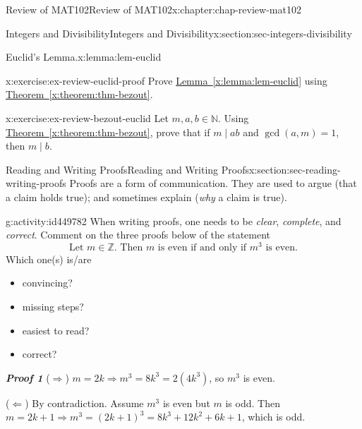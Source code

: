 \documentclass[oneside,10pt,]{book}
\newcommand{\xreffont}{\relax}
\newcommand{\alert}[1]{\textbf{\textit{#1}}}
\numberwithin{equation}{section}
\begin{document}
\begin{chapterptx}{Review of MAT102}{}{Review of MAT102}{}{}{x:chapter:chap-review-mat102}
\begin{sectionptx}{Integers and Divisibility}{}{Integers and Divisibility}{}{}{x:section:sec-integers-divisibility}
\begin{lemma}{Euclid's Lemma.}{}{x:lemma:lem-euclid}
\end{lemma}
\begin{inlineexercise}{}{x:exercise:ex-review-euclid-proof}%
Prove \hyperref[x:lemma:lem-euclid]{Lemma~{\xreffont\ref{x:lemma:lem-euclid}}} using \hyperref[x:theorem:thm-bezout]{Theorem~{\xreffont\ref{x:theorem:thm-bezout}}}.%
\end{inlineexercise}
\begin{inlineexercise}{}{x:exercise:ex-review-bezout-euclid}%
Let \(m,a,b \in \mathbb{N}\). Using \hyperref[x:theorem:thm-bezout]{Theorem~{\xreffont\ref{x:theorem:thm-bezout}}}, prove that if \(m \mid ab\) and \(\gcd(a,m) = 1\), then \(m \mid b\).%
\end{inlineexercise}
\end{sectionptx}
%
%
\typeout{************************************************}
\typeout{************************************************}
%
\begin{sectionptx}{Reading and Writing Proofs}{}{Reading and Writing Proofs}{}{}{x:section:sec-reading-writing-proofs}
Proofs are a form of communication. They are used to argue (that a claim holds true); and sometimes explain (\emph{why} a claim is true).%
\begin{activity}{}{g:activity:id449782}%
When writing proofs, one needs to be \emph{clear}, \emph{complete}, and \emph{correct}. Comment on the three proofs below of the statement%
\begin{equation*}
\text{Let } m \in \mathbb{Z}\text{. Then }m\text{ is even if and only if } m^3 \text{ is even}\text{.}
\end{equation*}
Which one(s) is\slash{}are%
\begin{multicols}{2}
\begin{itemize}[label=\textbullet]
\item{}convincing?%
\item{}missing steps?%
\item{}easiest to read?%
\item{}correct?%
\end{itemize}
\end{multicols}
%
\par
\alert{Proof 1} (\(\Rightarrow\)) \(m = 2k \Rightarrow m^3 = 8k^3 = 2(4k^3)\), so \(m^3\) is even.%
\par
(\(\Leftarrow\)) By contradiction. Assume \(m^3\) is even but \(m\) is odd. Then \(m = 2k + 1 \Rightarrow m^3 =(2k+1)^3 = 8k^3 + 12k^2 + 6k + 1\), which is odd.%
\par

\end{activity}
\end{sectionptx}
\end{chapterptx}
\end{document}
